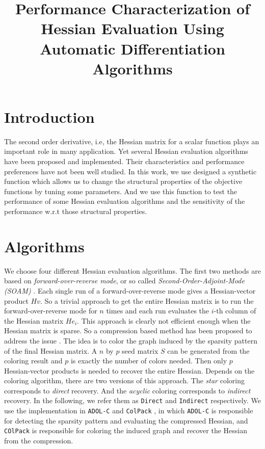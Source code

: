 \documentclass[12pt]{article}
\begin{document}
\title{Performance Characterization of Hessian Evaluation Using Automatic Differentiation Algorithms}
\maketitle
\section*{Introduction}
The second order derivative, i.e, the Hessian matrix for a scalar function plays an important role in many application. 
Yet several Hessian evaluation algorithms have been proposed and implemented. Their characteristics and performance preferences have not been well studied. In this work, we use designed a synthetic function which allows us to change the structural properties of the objective functions by tuning some parameters. And we use this function to test the performance of some Hessian evaluation algorithms and the sensitivity of the performance w.r.t those structural properties.

\section*{Algorithms}
We choose four different Hessian evaluation algorithms. The first two methods are based on {\em forward-over-reverse mode}, or so called {\em Second-Order-Adjoint-Mode (SOAM)} \cite{griewank2008evaluating, naumann2012art}. Each single run of a forward-over-reverse mode gives a Hessian-vector product $Hv$. So a trivial approach to get the entire Hessian matrix is to run the forward-over-reverse mode for $n$ times and each run evaluates the $i$-th column of the Hessian matrix $He_i$. This approach is clearly not efficient enough when the Hessian matrix is sparse.  So a compression based method has been proposed to address the issue \cite{gebremedhin2009efficient}. The idea is to color the graph induced by the sparsity pattern of the final Hessian matrix. A $n$ by $p$ seed matrix $S$ can be generated from the coloring result and $p$ is exactly the number of colors needed. Then only $p$ Hessian-vector products is needed to recover the entire Hessian.
Depends on the coloring algorithm, there are two versions of this approach. The {\em star} coloring corresponds to {\em direct} recovery. And the {\em acyclic} coloring corresponds to {\em indirect} recovery. In the following, we refer them as {\tt Direct} and {\tt Indirect} respectively. We use the implementation in {\tt ADOL-C} \cite{walther2009getting} and {\tt ColPack} \cite{gebremedhin2013colpack}, in which {\tt ADOL-C} is responsible for detecting the sparsity pattern and evaluating the compressed Hessian, and {\tt COlPack} is responsible for coloring the induced graph and recover the Hessian from the compression.
\end{document}
